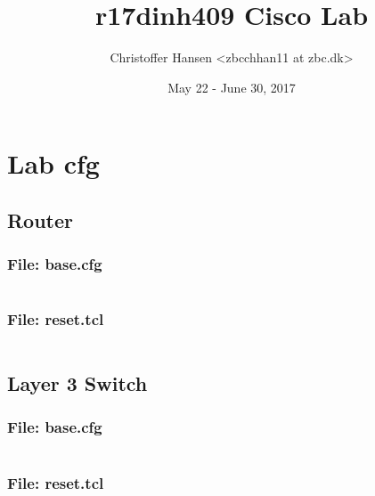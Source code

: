 \documentclass{article}
\begin{document}
\title{r17dinh409 Cisco Lab}
\author{Christoffer Hansen <zbcchhan11 at zbc.dk>}
\date{May 22 - June 30, 2017}
\maketitle

\newpage
\tableofcontents


%
%
\section{Lab cfg}


\subsection{Router}
\subsubsection{File: base.cfg}
\inputminted[frame=lines,framesep=2mm,baselinestretch=1.2,bgcolor=lightgray,fontsize=\footnotesize,linenos,breaklines=true]{tcl}{code/router/base.cfg}
\subsubsection{File: reset.tcl}
\inputminted[frame=lines,framesep=2mm,baselinestretch=1.2,bgcolor=lightgray,fontsize=\footnotesize,linenos,breaklines=true]{tcl}{code/router/reset.tcl}


\subsection{Layer 3 Switch}
\subsubsection{File: base.cfg}
\inputminted[frame=lines,framesep=2mm,baselinestretch=1.2,bgcolor=lightgray,fontsize=\footnotesize,linenos,breaklines=true]{tcl}{code/l3switch/base.cfg}
\subsubsection{File: reset.tcl}
\inputminted[frame=lines,framesep=2mm,baselinestretch=1.2,bgcolor=lightgray,fontsize=\footnotesize,linenos,breaklines=true]{tcl}{code/l3switch/reset.tcl}
\end{document}
